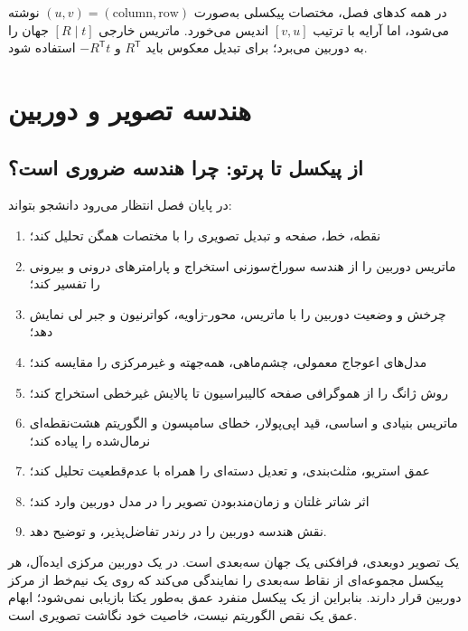 \documentclass[12pt,openany,oneside]{book}
\newcommand{\trans}{^{\mathsf T}}
\begin{document}
\begin{codecontract}
در همه کدهای فصل، مختصات پیکسلی به‌صورت \((u,v)=(\text{column},\text{row})\) نوشته می‌شود،
اما آرایه  با ترتیب \([v,u]\) اندیس می‌خورد. ماتریس خارجی \([R\mid t]\)
جهان را به دوربین می‌برد؛ برای تبدیل معکوس باید \(R\trans\) و \(-R\trans t\) استفاده شود.
\end{codecontract}

\tableofcontents

\mainmatter
\setcounter{chapter}{5}
\chapter{هندسه تصویر و دوربین}

\section{از پیکسل تا پرتو: چرا هندسه ضروری است؟}

\begin{learningbox}
در پایان فصل انتظار می‌رود دانشجو بتواند:
\begin{enumerate}
\item نقطه، خط، صفحه و تبدیل تصویری را با مختصات همگن تحلیل کند؛
\item ماتریس دوربین را از هندسه سوراخ‌سوزنی استخراج و پارامترهای درونی و بیرونی را تفسیر کند؛
\item چرخش و وضعیت دوربین را با ماتریس، محور-زاویه، کواترنیون و جبر لی نمایش دهد؛
\item مدل‌های اعوجاج معمولی، چشم‌ماهی، همه‌جهته و غیرمرکزی را مقایسه کند؛
\item روش ژانگ را از هموگرافی صفحه کالیبراسیون تا پالایش غیرخطی استخراج کند؛
\item ماتریس بنیادی و اساسی، قید اپی‌پولار، خطای سامپسون و الگوریتم هشت‌نقطه‌ای نرمال‌شده را پیاده کند؛
\item عمق استریو، مثلث‌بندی،  و تعدیل دسته‌ای را همراه با عدم‌قطعیت تحلیل کند؛
\item اثر شاتر غلتان و زمان‌مندبودن تصویر را در مدل دوربین وارد کند؛
\item نقش هندسه دوربین را در رندر تفاضل‌پذیر،  و  توضیح دهد.
\end{enumerate}
\end{learningbox}

یک تصویر دوبعدی، فرافکنی یک جهان سه‌بعدی است. در یک دوربین مرکزی ایده‌آل، هر پیکسل مجموعه‌ای از نقاط سه‌بعدی را
نمایندگی می‌کند که روی یک نیم‌خط از مرکز دوربین قرار دارند. بنابراین از یک پیکسل منفرد عمق به‌طور یکتا بازیابی نمی‌شود؛
ابهام عمق یک نقص الگوریتم نیست، خاصیت خود نگاشت تصویری است.
\end{document}
